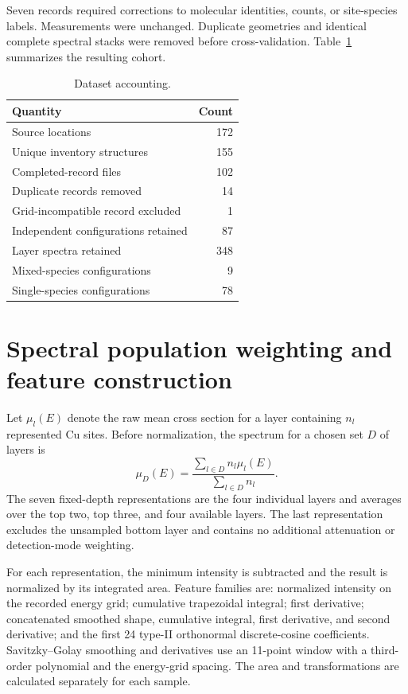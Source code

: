 \documentclass[11pt,a4paper]{article}
\begin{document}
Seven records required corrections to molecular identities, counts, or site-species labels. Measurements were unchanged. Duplicate geometries and identical complete spectral stacks were removed before cross-validation. Table~\ref{tab:cohort} summarizes the resulting cohort.

\begin{table}[htbp]\centering
\caption{Dataset accounting.}\label{tab:cohort}
\begin{tabular}{@{}lr@{}}\toprule
Quantity & Count\\\midrule
Source locations &172\\
Unique inventory structures &155\\
Completed-record files &102\\
Duplicate records removed &14\\
Grid-incompatible record excluded &1\\
Independent configurations retained &87\\
Layer spectra retained &348\\
Mixed-species configurations &9\\
Single-species configurations &78\\\bottomrule
\end{tabular}
\end{table}

\section{Spectral population weighting and feature construction}
Let $\mu_l(E)$ denote the raw mean cross section for a layer containing $n_l$ represented Cu sites. Before normalization, the spectrum for a chosen set $D$ of layers is
\begin{equation}
\mu_D(E)=\frac{\sum_{l\in D}n_l\mu_l(E)}{\sum_{l\in D}n_l}.
\end{equation}
The seven fixed-depth representations are the four individual layers and averages over the top two, top three, and four available layers. The last representation excludes the unsampled bottom layer and contains no additional attenuation or detection-mode weighting.

For each representation, the minimum intensity is subtracted and the result is normalized by its integrated area. Feature families are: normalized intensity on the recorded energy grid; cumulative trapezoidal integral; first derivative; concatenated smoothed shape, cumulative integral, first derivative, and second derivative; and the first 24 type-II orthonormal discrete-cosine coefficients. Savitzky--Golay smoothing and derivatives use an 11-point window with a third-order polynomial and the energy-grid spacing. The area and transformations are calculated separately for each sample.
\end{document}
